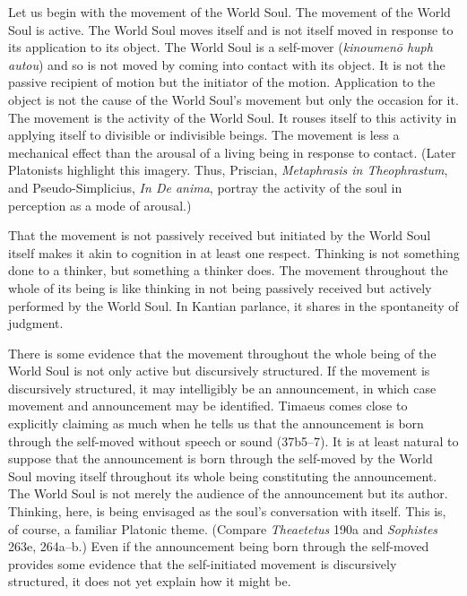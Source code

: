 Let us begin with the movement of the World Soul. The movement of the World Soul is active. The World Soul moves itself and is not itself moved in response to its application to its object. The World Soul is a self-mover (\emph{kinoumenō huph autou}) and so is not moved by coming into contact with its object. It is not the passive recipient of motion but the initiator of the motion. Application to the object is not the cause of the World Soul's movement but only the occasion for it. The movement is the activity of the World Soul. It rouses itself to this activity in applying itself to divisible or indivisible beings. The movement is less a mechanical effect than the arousal of a living being in response to contact. (Later Platonists highlight this imagery. Thus, Priscian, \emph{Metaphrasis in Theophrastum}, and Pseudo-Simplicius, \emph{In De anima}, portray the activity of the soul in perception as a mode of arousal.)

That the movement is not passively received but initiated by the World Soul itself makes it akin to cognition in at least one respect. Thinking is not something done to a thinker, but something a thinker does. The movement throughout the whole of its being is like thinking in not being passively received but actively performed by the World Soul. In Kantian parlance, it shares in the spontaneity of judgment.

There is some evidence that the movement throughout the whole being of the World Soul is not only active but discursively structured. If the movement is discursively structured, it may intelligibly be an announcement, in which case movement and announcement may be identified. Timaeus comes close to explicitly claiming as much when he tells us that the announcement is born through the self-moved without speech or sound (37b5--7). It is at least natural to suppose that the announcement is born through the self-moved by the World Soul moving itself throughout its whole being constituting the announcement. The World Soul is not merely the audience of the announcement but its author. Thinking, here, is being envisaged as the soul's conversation with itself. This is, of course, a familiar Platonic theme. (Compare \emph{Theaetetus} 190a and \emph{Sophistes} 263e, 264a--b.) Even if the announcement being born through the self-moved provides some evidence that the self-initiated movement is discursively structured, it does not yet explain how it might be.

